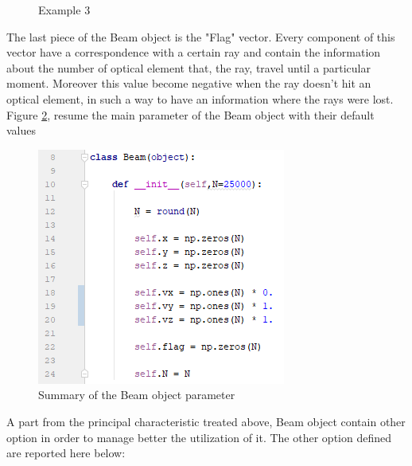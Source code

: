\begin{figure}[H]
%
\centering
%
\quad
%
%
\caption{Example 3}
\label{fig :p3}
\end{figure}
The last piece of the Beam object is the "Flag" vector. Every component of this vector have a correspondence with a certain ray and contain the information about the number of optical element that, the ray, travel until a particular moment. Moreover this value become negative when the ray doesn't hit an optical element, in such a way to have an information where the rays were lost. Figure \ref{fig: ResumeBeam}, resume the main parameter of the Beam object with their default values
\begin{figure}[H]
%
\centering
%
\includegraphics[width=.4\textwidth]{Immagini/Chapter3/ResumeBeam}
%
\caption{Summary of the Beam object parameter}
%
\label{fig: ResumeBeam}
%
\end{figure}
A part from the principal characteristic treated above, Beam object contain other option in order to manage better the utilization of it. The other option defined are reported here below:
